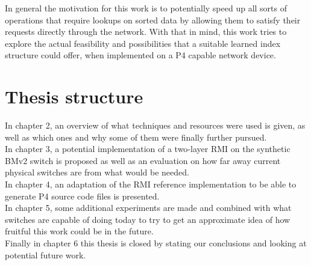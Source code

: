 In general the motivation for this work is to potentially speed up all sorts of operations that require lookups on sorted data by allowing them to satisfy their requests directly through the network. With that in mind, this work tries to explore the actual feasibility and possibilities that a suitable learned index structure could offer, when implemented on a P4 capable network device.\pagebreak

\section{Thesis structure}
In chapter 2, an overview of what techniques and resources were used is given, as well as which ones and why some of them were finally further pursued.\\

\noindent
In chapter 3, a potential implementation of a two-layer RMI on the synthetic BMv2 \cite{bmv2} switch is proposed as well as an evaluation on how far away current physical switches are from what would be needed.\\

\noindent
In chapter 4, an adaptation of the RMI reference implementation \cite{cdfshop} to be able to generate P4 source code files is presented.\\

\noindent
In chapter 5, some additional experiments are made and combined with what switches are capable of doing today to try to get an approximate idea of how fruitful this work could be in the future.\\

\noindent
Finally in chapter 6 this thesis is closed by stating our conclusions and looking at potential future work.
